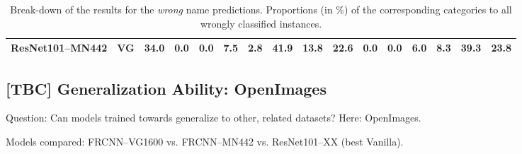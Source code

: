 \begin{table}[t]
\begin{tabular}{ll|r@{~}|r@{~}r@{~}r@{~}r@{~}|r@{~}r@{~}||r@{~}|r@{~}r@{~}r@{~}r@{~}|r@{~}r@{~}}
	ResNet101--MN442 & VG &                 34.0 &             0.0 &                 0.0 &                   7.5 &            2.8 &           41.9 &             13.8 &                 22.6 &             0.0 &                 0.0 &                   6.0 &            8.3 &           39.3 &             23.8 \\
	\bottomrule
\end{tabular}
\caption{Break-down of the results for the \textit{wrong} name predictions. Proportions (in \%) of the corresponding categories to all wrongly classified instances.  \label{tab:exp_details_wrong}}
\end{table}




\subsection{[TBC] Generalization Ability: OpenImages}
\label{sect:exp_openimages}
Question: Can models trained towards \mn generalize to other, related datasets? Here: OpenImages. \

Models compared: FRCNN--VG1600 vs. FRCNN--MN442 vs. ResNet101--XX (best Vanilla).
